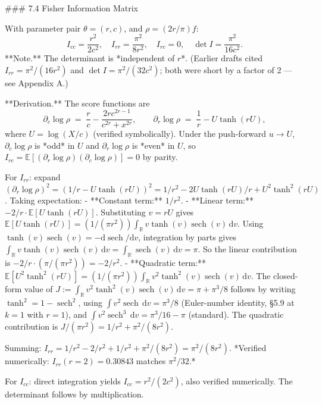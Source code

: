 ### 7.4 Fisher Information Matrix

With parameter pair $\theta = (r,c)$, and $\rho = (2r/\pi)f$:
$$
\boxed{\;I_{cc} = \frac{r^{2}}{2c^{2}},\quad I_{rr} = \frac{\pi^{2}}{8r^{2}},\quad I_{rc} = 0,\quad \det I = \frac{\pi^{2}}{16c^{2}}.\;}
$$
**Note.** The determinant is *independent of $r$*. (Earlier drafts cited $I_{rr} = \pi^{2}/(16r^{2})$ and $\det I = \pi^{2}/(32c^{2})$; both were short by a factor of 2 — see Appendix A.)

**Derivation.** The score functions are
$$
\partial_{c}\log\rho \;=\; \frac{r}{c} - \frac{2rc^{2r-1}}{c^{2r}+x^{2r}},\qquad \partial_{r}\log\rho \;=\; \frac{1}{r} - U\tanh(rU),
$$
where $U = \log(X/c)$ (verified symbolically). Under the push‑forward $u\to U$, $\partial_{c}\log\rho$ is *odd* in $U$ and $\partial_{r}\log\rho$ is *even* in $U$, so $I_{rc} = \mathbb E[(\partial_{r}\log\rho)(\partial_{c}\log\rho)] = 0$ by parity.

For $I_{rr}$: expand $(\partial_{r}\log\rho)^{2} = (1/r - U\tanh(rU))^{2} = 1/r^{2} - 2U\tanh(rU)/r + U^{2}\tanh^{2}(rU)$. Taking expectation:
- **Constant term:** $1/r^{2}$.
- **Linear term:** $-2/r\cdot\mathbb E[U\tanh(rU)]$. Substituting $v = rU$ gives $\mathbb E[U\tanh(rU)] = (1/(\pi r^{2}))\int_{\mathbb R}v\tanh(v)\operatorname{sech}(v)\,\mathrm dv$. Using $\tanh(v)\operatorname{sech}(v) = -\mathrm d\operatorname{sech}/\mathrm dv$, integration by parts gives $\int_{\mathbb R}v\tanh(v)\operatorname{sech}(v)\,\mathrm dv = \int_{\mathbb R}\operatorname{sech}(v)\,\mathrm dv = \pi$. So the linear contribution is $-2/r\cdot(\pi/(\pi r^{2})) = -2/r^{2}$.
- **Quadratic term:** $\mathbb E[U^{2}\tanh^{2}(rU)] = (1/(\pi r^{2}))\int_{\mathbb R}v^{2}\tanh^{2}(v)\operatorname{sech}(v)\,\mathrm dv$. The closed-form value of $J := \int_{\mathbb R}v^{2}\tanh^{2}(v)\operatorname{sech}(v)\,\mathrm dv = \pi + \pi^{3}/8$ follows by writing $\tanh^{2} = 1 - \operatorname{sech}^{2}$, using $\int v^{2}\operatorname{sech}\,\mathrm dv = \pi^{3}/8$ (Euler-number identity, §5.9 at $k=1$ with $r=1$), and $\int v^{2}\operatorname{sech}^{3}\,\mathrm dv = \pi^{3}/16-\pi$ (standard). The quadratic contribution is $J/(\pi r^{2}) = 1/r^{2}+\pi^{2}/(8r^{2})$.

Summing: $I_{rr} = 1/r^{2} - 2/r^{2} + 1/r^{2} + \pi^{2}/(8r^{2}) = \pi^{2}/(8r^{2})$. *Verified numerically: $I_{rr}(r=2)=0.30843$ matches $\pi^{2}/32$.*

For $I_{cc}$: direct integration yields $I_{cc} = r^{2}/(2c^{2})$, also verified numerically. The determinant follows by multiplication.

